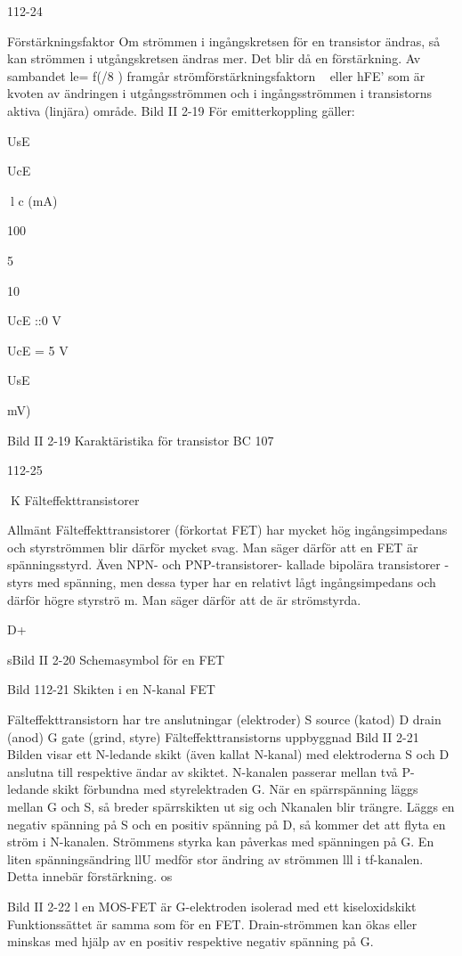 {112-24

Förstärkningsfaktor
Om strömmen i ingångskretsen för en transistor ändras, så kan strömmen i utgångskretsen ändras mer. Det blir då en förstärkning.
Av sambandet le= f(/8 ) framgår strömförstärkningsfaktorn ~ eller hFE' som är kvoten av ändringen i utgångsströmmen och i
ingångsströmmen i transistorns aktiva (linjära) område.
Bild II 2-19
För emitterkoppling gäller:

UsE

UcE

l c (mA)

100

5

10

UcE ::0 V

UcE = 5 V

UsE {mV)

Bild II 2-19 Karaktäristika för transistor BC 107

112-25

K
Fälteffekttransistorer

Allmänt
Fälteffekttransistorer (förkortat FET) har
mycket hög ingångsimpedans och styrströmmen blir därför mycket svag. Man säger
därför att en FET är spänningsstyrd.
Även NPN- och PNP-transistorer- kallade bipolära transistorer - styrs med spänning, men dessa typer har en relativt lågt
ingångsimpedans och därför högre styrströ m.
Man säger därför att de är strömstyrda.

D+

sBild II 2-20 Schemasymbol för en FET

Bild 112-21 Skikten i en N-kanal FET

Fälteffekttransistorn har tre anslutningar
(elektroder)
S source (katod)
D drain (anod)
G gate (grind, styre)
Fälteffekttransistorns uppbyggnad
Bild II 2-21
Bilden visar ett N-ledande skikt (även kallat
N-kanal) med elektroderna S och D anslutna
till respektive ändar av skiktet. N-kanalen
passerar mellan två P-ledande skikt förbundna med styrelektraden G.
När en spärrspänning läggs mellan G
och S, så breder spärrskikten ut sig och Nkanalen blir trängre. Läggs en negativ spänning på S och en positiv spänning på D, så
kommer det att flyta en ström i N-kanalen.
Strömmens styrka kan påverkas med spänningen på G.
En liten spänningsändring llU medför
stor ändring av strömmen lll i tf-kanalen.
Detta innebär förstärkning. os

Bild II 2-22
l en MOS-FET är G-elektroden isolerad med
ett kiseloxidskikt Funktionssättet är samma
som för en FET. Drain-strömmen kan ökas
eller minskas med hjälp av en positiv respektive negativ spänning på G.

}}
